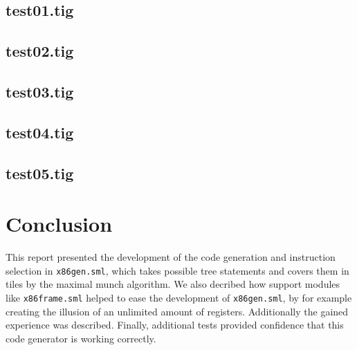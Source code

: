 \documentclass{article}
\begin{document}
\subsection{test01.tig}



\subsection{test02.tig}



\subsection{test03.tig}



\subsection{test04.tig}



\subsection{test05.tig}



\section{Conclusion}

This report presented the development of the code generation and instruction selection in \texttt{x86gen.sml}, which takes possible tree statements and covers them in tiles by the maximal munch algorithm. We also decribed how support modules like \texttt{x86frame.sml} helped to ease the development of \texttt{x86gen.sml}, by for example creating the illusion of an unlimited amount of registers. Additionally the gained experience was described. Finally, additional tests provided confidence that this code generator is working correctly.
\end{document}
